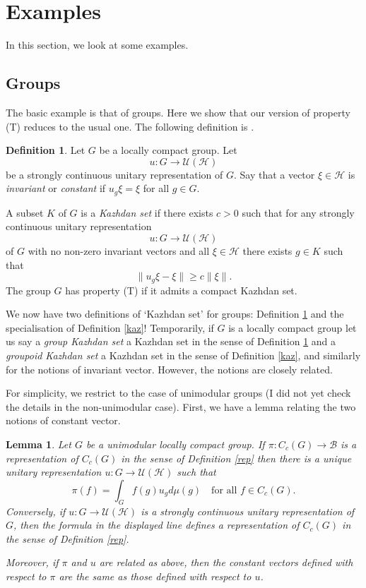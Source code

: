 \documentclass{article}
\newcommand{\h}{\mathcal{H}}
\theoremstyle{plain}
\newtheorem{lemma}[theorem]{Lemma}
\theoremstyle{definition}
\newtheorem{definition}[theorem]{Definition}
\theoremstyle{remark}
\begin{document}
\section{Examples}

In this section, we look at some examples.

\subsection*{Groups}

The basic example is that of groups.  Here we show that our version of property (T) reduces to the usual one.  The following definition is \cite[Definition 1.1.3]{Bekka:2000kx}.

\begin{definition}\label{gpt}
Let $G$ be a locally compact group.  Let 
$$
u:G\to \mathcal{U}(\h)
$$
be a strongly continuous unitary representation of $G$.  Say that a vector $\xi\in \h$ is \emph{invariant} or \emph{constant} if $u_g\xi=\xi$ for all $g\in G$.

A subset $K$ of $G$ is a \emph{Kazhdan set} if there exists $c>0$ such that for any strongly continuous unitary representation 
$$
u:G\to \mathcal{U}(\h)
$$
of $G$ with no non-zero invariant vectors and all $\xi\in \h$ there exists $g\in K$ such that 
$$
\|u_g\xi-\xi\|\geq c\|\xi\|.
$$
The group $G$ has property (T) if it admits a compact Kazhdan set.
\end{definition}

We now have two definitions of `Kazhdan set' for groups: Definition \ref{gpt} and the specialisation of Definition \ref{kaz}!  Temporarily, if $G$ is a locally compact group let us say a \emph{group Kazhdan set} a Kazhdan set in the sense of Definition \ref{gpt} and a \emph{groupoid Kazhdan set} a Kazhdan set in the sense of Definition \ref{kaz}, and similarly for the notions of invariant vector.  However, the notions are closely related.  

For simplicity, we restrict to the case of unimodular groups (I did not yet check the details in the non-unimodular case).  First, we have a lemma relating the two notions of constant vector.

\begin{lemma}\label{cons lem}
Let $G$ be a unimodular locally compact group.  If $\pi:C_c(G)\to \mathcal{B}$ is a representation of $C_c(G)$ in the sense of Definition \ref{rep} then there is a unique unitary representation $u:G\to \mathcal{U}(\h)$ such that
$$
\pi(f)=\int_G f(g)u_g d\mu(g)\quad  \text{for all }f\in C_c(G).
$$
Conversely, if $u:G\to \mathcal{U}(\h)$ is a strongly continuous unitary representation of $G$, then the formula in the displayed line defines a representation of $C_c(G)$ in the sense of Definition \ref{rep}.  

Moreover, if $\pi$ and $u$ are related as above, then the constant vectors defined with respect to $\pi$ are the same as those defined with respect to $u$.
\end{lemma}
\end{document}
